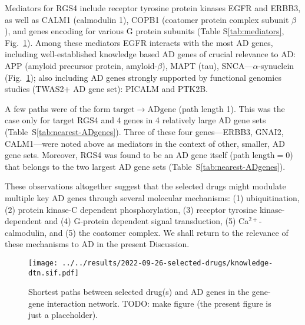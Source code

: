 \documentclass[letterpaper]{article}
\begin{document}
Mediators for RGS4 include receptor tyrosine protein kinases EGFR and ERBB3,
as well as CALM1 (calmodulin 1), COPB1 (coatomer protein complex subunit
$\beta$), and genes encoding for various G protein subunits (Table
S\ref{tab:mediators}, Fig.~\ref{fig:drug-AD-genes-network}).  Among these
mediators EGFR interacts with the most AD genes, including well-established
knowledge based AD genes of crucial relevance to AD: APP (amyloid precursor
protein, amyloid-$\beta$), MAPT (tau), SNCA---$\alpha$-synuclein
(Fig.~\ref{fig:drug-AD-genes-network}); also including AD genes strongly
supported by functional genomics studies (TWAS2+ AD gene set): PICALM and
PTK2B.

A few paths were of the form $\mathrm{target} \rightarrow \mathrm{AD gene}$
(path length 1).  This was the case only for target RGS4 and 4 genes in 4
relatively large AD gene sets (Table~S\ref{tab:nearest-ADgenes}).  Three of
these four genes---ERBB3, GNAI2, CALM1---were noted above as mediators in the
context of other, smaller, AD gene sets.  Moreover, RGS4 was found to be an AD
gene itself (path length$=0$) that belongs to the two largest AD gene sets
(Table~S\ref{tab:nearest-ADgenes}).

These observations altogether suggest that the selected drugs might modulate
multiple key AD genes through several molecular mechanisms: (1)
ubiquitination, (2) protein kinase-C dependent phosphorylation, (3) receptor
tyrosine kinase-dependent and (4) G-protein dependent signal transduction, (5)
Ca$^{2+}$-calmodulin, and (5) the coatomer complex.  We shall return to the
relevance of these mechanisms to AD in the present Discussion.


\begin{figure}
\texttt{[image: ../../results/2022-09-26-selected-drugs/knowledge-dtn.sif.pdf]}
  \caption{Shortest paths between selected drug(s) and AD genes in the
    gene-gene interaction network.  TODO: make figure (the present figure is
    just a placeholder).
}
\label{fig:drug-AD-genes-network}
\end{figure}
\end{document}
